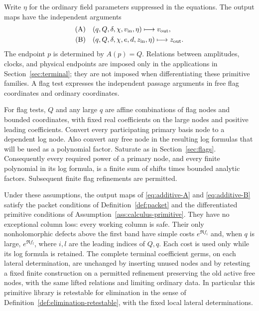 Write $\eta$ for the ordinary field parameters suppressed in the equations.
The output maps have the independent arguments
\begin{align*}
 \text{(A)}\quad &(q,Q,\delta,\chi,v_{\rm in},\eta)
          \longmapsto v_{\rm out},\\
 \text{(B)}\quad &(q,Q,\delta,\chi,e,d,z_{\rm in},\eta)
          \longmapsto z_{\rm out}.
\end{align*}
The endpoint $p$ is determined by $A(p)=Q$.  Relations between amplitudes,
clocks, and physical endpoints are imposed only in the applications in
Section~\ref{sec:terminal}; they are not imposed when differentiating
these primitive families.  A flag test expresses the independent passage
arguments in free flag coordinates and ordinary coordinates.

For flag tests, $Q$ and any large $q$ are affine combinations of flag
nodes and bounded coordinates, with fixed real coefficients on the large
nodes and positive leading coefficients.  Convert every participating
primary basis node to a dependent log node.  Also convert any free node
in the resulting log formulas that will be used as a polynomial factor.
Saturate as in Section~\ref{sec:flags}.  Consequently every required power
of a primary node, and every finite polynomial in its log formula, is a
finite sum of shifts times bounded analytic factors.  Subsequent finite
flag refinements are permitted.

\begin{theorem}\label{thm:additive-packets}
Under these assumptions, the output maps of \eqref{eq:additive-A} and
\eqref{eq:additive-B} satisfy the packet conditions of
Definition~\ref{def:packet} and the differentiated primitive conditions of
Assumption~\ref{ass:calculus-primitive}.  They have no exceptional column
loss: every working column is safe.  Their only nonholomorphic defects
above the first band have simple costs $e^{\Re f_i}$ and, when $q$ is
large, $e^{\Re f_l}$, where $i,l$ are the leading indices of $Q,q$.
Each cost is used only while its log formula is retained.  The complete
terminal coefficient germs, on each lateral determination, are unchanged
by inserting unused nodes and by retesting a fixed finite construction
on a permitted refinement preserving the old active free nodes, with the
same lifted relations and limiting ordinary data.
In particular this primitive library is retestable for elimination
in the sense of Definition~\ref{def:elimination-retestable}, with the
fixed local lateral determinations.
\end{theorem}

